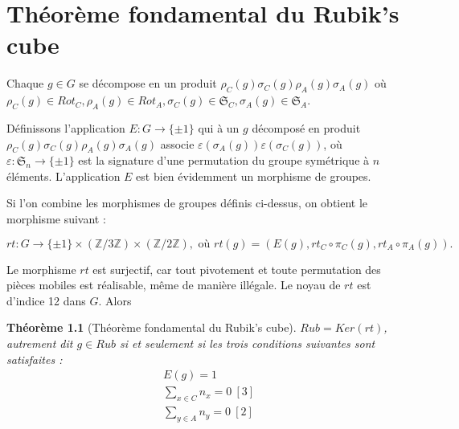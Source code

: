\documentclass[french]{report}
\newtheorem{theorem}{Théorème}
\begin{document}



\chapter{Théorème fondamental du Rubik's cube} \label{chap_fondamental}

Chaque $g \in G$ se décompose en un produit $\rho _{C}(g) \sigma _{C}(g)  \rho _{A}(g) \sigma _{A}(g)$ où $\rho _{ C}(g) \in Rot_C, \rho_A(g) \in Rot_A, \sigma_C(g) \in \mathfrak{S}_{C}, \sigma _{A}(g) \in \mathfrak{S}_{A}$.

Définissons l'application $E : G \to \{ \pm 1 \} $ qui à un $g$ décomposé en produit $\rho_C(g) \sigma_C(g) \rho_A(g) \sigma_A(g)$ associe $\varepsilon (\sigma_A(g)) \varepsilon (\sigma_C(g))$, où $\varepsilon : \mathfrak{S}_n \to \{ \pm 1 \} $ est la signature d'une permutation du groupe symétrique à $n$ éléments. L'application $E$ est bien évidemment un morphisme de groupes.

Si l'on combine les morphismes de groupes définis ci-dessus, on obtient le morphisme suivant :

$$rt : G \to \{ \pm 1 \} \times (\mathbb{Z}/{ 3 }\mathbb{Z}) \times (\mathbb{Z}/{ 2 }\mathbb{Z}), \text{ où } rt(g) = (E(g), rt_C \circ \pi_C(g), rt_A \circ \pi_A(g)). $$

Le morphisme $rt$ est surjectif, car tout pivotement et toute permutation des pièces mobiles est réalisable, même de manière illégale. Le noyau de $rt$ est d'indice 12 dans $G$. Alors

\begin{theorem}[Théorème fondamental du Rubik's cube]\label{thm-fondamental}
  $Rub = Ker(rt)$, autrement dit $g \in Rub$ si et seulement si les trois conditions suivantes sont satisfaites :
  \begin{gather}
    E (g)=1 \label{permutation-paire}\\
    \sum_{x \in C} n_x = 0 \ [3] \label{orientation-totale-coins} \\
    \sum_{y \in A} n_y = 0 \ [2] \label{orientation-totale-aretes}
  \end{gather}
\end{theorem}
\end{document}
